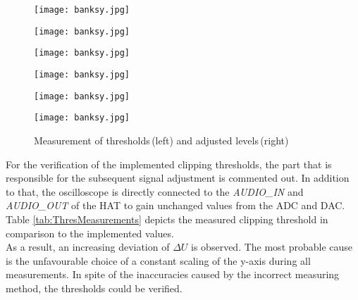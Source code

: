 \begin{figure}[H]

\begin{minipage}[t]{0.5\textwidth}
\texttt{[image: banksy.jpg]}
\end{minipage}
\begin{minipage}[t]{0.5\textwidth}
\texttt{[image: banksy.jpg]}
\end{minipage}

\begin{minipage}[t]{0.5\textwidth}
\texttt{[image: banksy.jpg]}
\end{minipage}
\begin{minipage}[t]{0.5\textwidth}
\texttt{[image: banksy.jpg]}
\end{minipage}

\begin{minipage}[t]{0.5\textwidth}
\texttt{[image: banksy.jpg]}
\end{minipage}
\begin{minipage}[t]{0.5\textwidth}
\texttt{[image: banksy.jpg]}
\label{fig:Threshold}
\end{minipage}

	\caption[Menu]{Measurement of thresholds\,(left) and adjusted levels\,(right) }
	\label{fig:Thresholds}
\end{figure}


For the verification of the implemented clipping thresholds, the part that is responsible for the subsequent signal adjustment is commented out. In addition to that, the oscilloscope is directly connected to the \textit{AUDIO\_IN} and \textit{AUDIO\_OUT} of the HAT to gain unchanged values from the ADC and DAC.
Table \ref{tab:ThresMeasurements} depicts the measured clipping threshold in comparison to the implemented values.\\
As a result, an increasing deviation of $\Delta U$ is observed. The most probable cause is the unfavourable choice of a constant scaling of the y-axis during all measurements. In spite of the inaccuracies caused by the incorrect measuring method, the thresholds could be verified. 

